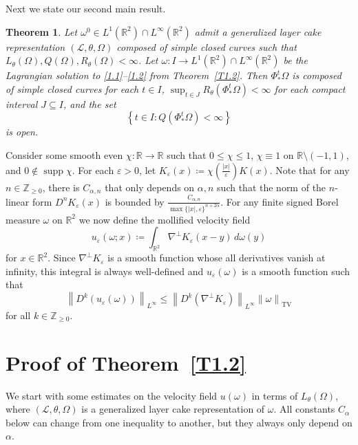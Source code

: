 \documentclass[reqno,centertags,12pt]{amsart}
\newtheorem{theorem}{Theorem}[section]
\theoremstyle{definition}
\numberwithin{equation}{section}
\newcommand{\abs}[1]{\left\lvert#1\right\rvert}
\newcommand{\norm}[1]{\left\|#1\right\|}
\newcommand{\set}[1]{\left\{ #1 \right\}}
\newcommand{\bbR}{{\mathbb{R}}}
\newcommand{\bbZ}{{\mathbb{Z}}}
\newcommand{\eps}{\varepsilon}
\newcommand{\tht}{\theta}
\begin{document}
Next we state our second main result.

\begin{theorem}\label{T1.4}
    Let $\omega^{0}\in L^{1}(\bbR^{2})\cap L^{\infty}(\bbR^{2})$ admit a
    generalized layer cake representation $(\mathcal{L},\theta,\Omega)$
    composed of simple closed curves such that $L_{\tht}(\Omega), Q(\Omega), R_{\tht}(\Omega) < \infty$.
    Let $\omega\colon I\to L^{1}(\bbR^{2})\cap L^{\infty}(\bbR^{2})$ be
    the Lagrangian solution to \eqref{1.1}--\eqref{1.2}
from Theorem~\ref{T1.2}.
    Then $\Phi_{*}^{t}\Omega$ is composed of simple closed curves for each $t\in I$,
    $\sup_{t\in J}R_{\tht}(\Phi_{*}^{t}\Omega) < \infty$ for each compact interval
    $J\subseteq I$, and the set
    \[
        \set{t\in I \colon Q(\Phi_{*}^{t}\Omega) < \infty}
    \]
    is  open.
\end{theorem}

Consider some smooth even $\chi\colon\bbR\to\bbR$
such that $0\leq\chi\leq 1$, $\chi\equiv 1$ on $\bbR\setminus(-1,1)$, and
$0\notin\operatorname{supp}\chi$. For each $\eps>0$, let
$K_{\eps}(x) \coloneqq \chi\left(\frac{\abs{x}}{\eps}\right)K(x)$.
Note that for any $n\in\bbZ_{\geq 0}$, there is $C_{\alpha,n}$
that only depends on $\alpha,n$ such that the norm of the $n$-linear form
$D^{n}K_{\eps}(x)$ is bounded by
$\frac{C_{\alpha,n}}{\max\{\abs{x},\eps\}^{n+2\alpha}}$.
For any finite signed Borel measure $\omega$ on $\bbR^{2}$
we now define the mollified velocity field
\[
    u_{\eps}(\omega;x)\coloneqq
    \int_{\bbR^{2}}\nabla^{\perp}K_{\eps}(x-y)\,d\omega(y)
\]
for $x\in\bbR^{2}$. Since $\nabla^{\perp}K_{\eps}$ is a smooth function
whose all derivatives vanish at infinity,
this integral is always well-defined and $u_{\eps}(\omega)$ is a smooth function such that
\begin{equation}\label{1.8}
    \norm{D^{k}(u_{\eps}(\omega))}_{L^{\infty}} \leq
    \norm{D^{k}(\nabla^{\perp}K_{\eps})}_{L^{\infty}}\norm{\omega}_{\mathrm{TV}}
\end{equation}
for all $k\in\bbZ_{\geq 0}$.


\section{Proof of Theorem~\ref{T1.2}}

We start with some estimates on the velocity field $u(\omega)$
in terms of $L_{\tht}(\Omega)$, where $(\mathcal{L},\theta,\Omega)$ is
a generalized layer cake representation of $\omega$.
All constants $C_{\alpha}$ below
can change from one inequality to another, but they always only depend  on $\alpha$.
\end{document}
